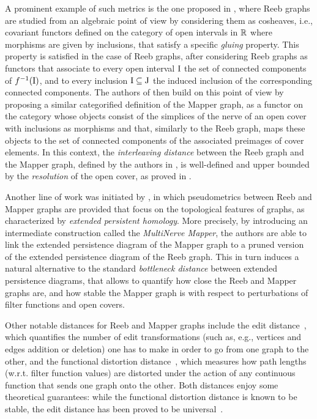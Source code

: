 A prominent example of such metrics is the one proposed in \cite{de2016categorified}, where Reeb graphs are studied from an algebraic point of view by considering them as cosheaves, i.e., covariant functors defined on the category of open intervals in $\mathbb{R}$ where morphisms are given by inclusions, that satisfy a specific \emph{gluing} property. This property is satisfied in the case of Reeb graphs, after considering Reeb graphs as functors that associate to every open interval ${\mathrm {I}}$ the set of connected components of $f^{-1}({\mathrm {I}})$, and to every inclusion ${\mathrm {I}}\subseteq\mathrm{J}$ the induced inclusion of the corresponding connected components. The authors of \cite{munch_convergence_2016} then build on this point of view by proposing a similar categorified definition of the Mapper graph, as a functor on the category whose objects consist of the simplices of the nerve of an open cover with inclusions as morphisms and that, similarly to the Reeb graph, maps these objects to the set of connected components of the associated preimages of cover elements. In this context, the \emph{interleaving distance} between the Reeb graph and the Mapper graph, defined by the authors in \cite{de2016categorified}, is well-defined and upper bounded by the \emph{resolution} of the open cover, as proved in \cite{munch_convergence_2016}.

Another line of work was initiated by \cite{carriere2018structure}, in which pseudometrics between Reeb and Mapper graphs are provided that focus on the topological features of graphs, as characterized by \emph{extended persistent homology}. More precisely, by introducing an intermediate construction called the \emph{MultiNerve Mapper}, the authors are able to link the extended persistence diagram of the Mapper graph to a pruned version of the extended persistence diagram of the Reeb graph. This in turn induces a natural alternative to the standard \emph{bottleneck distance} between extended persistence diagrams, that allows to quantify how close the Reeb and Mapper graphs are, and how stable the Mapper graph is with respect to perturbations of filter functions and open covers. 

Other notable distances for Reeb and Mapper graphs include the edit distance~\cite{bauer_edit_2016, bauer_reeb_2021}, which quantifies the number of edit transformations (such as, e.g., vertices and edges addition or deletion) one has to make in order to go from one graph to the other, and the functional distortion distance~\cite{bauer_measuring_2014}, which measures how path lengths (w.r.t. filter function values) are distorted under the action of any continuous function that sends one graph onto the other. Both distances enjoy some theoretical guarantees: while the functional distortion distance is known to be stable, the edit distance has been proved to be universal~\cite{bauer_reeb_2021}. 


